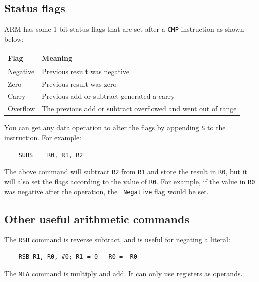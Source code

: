 
\subsection{Status flags}

ARM has some 1-bit status flags that are set after a {\tt CMP} instruction as
shown below:

\begin{tabularx}{0.8\textwidth}{l|X}
	Flag & Meaning\\ \hline

	Negative & Previous result was negative\\ \hline

	Zero & Previous result was zero\\ \hline

	Carry & Previous add or subtract generated a carry\\ \hline

	Overflow & The previous add or subtract overflowed and went out of range\\
	\hline
\end{tabularx}

You can get any data operation to alter the flags by appending {\tt S} to the
instruction. For example:

\begin{verbatim}
	SUBS	R0, R1, R2
\end{verbatim}

The above command will subtract {\tt R2} from {\tt R1} and store the result in
{\tt R0}, but it will also set the flags according to the value of {\tt R0}. For
example, if the value in {\tt R0} was negative after the operation, the {\tt
Negative} flag would be set.

\subsection{Other useful arithmetic commands}

The {\tt RSB} command is reverse subtract, and is useful for negating a literal:

\begin{verbatim}
	RSB	R1, R0, #0; R1 = 0 - R0 = -R0
\end{verbatim}

The {\tt MLA} command is multiply and add. It can only use registers as
operands.

